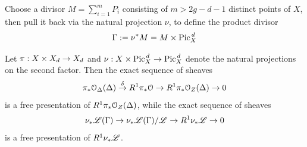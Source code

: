 		\begin{defi}\label{def:Gamma}
			Choose a divisor $M = \sum_{i=1}^m P_i$ consisting of $m > 2g-d-1$ distinct points of $X$, then pull it back via the natural projection $\nu$, to define the product divisor $$\Gamma := \nu^* M = M\times \operatorname{Pic}^{\,d}_X$$
		\end{defi}	


		\begin{prop}\label{prop:free_pres}
			Let $\pi : X\times X_d \to X_d$ and $\nu : X\times \operatorname{Pic}^{\,d}_X \to \operatorname{Pic}^{\,d}_X$ denote the natural projections on the second factor. Then the exact sequence of sheaves
			\begin{equation}\label{eq:univ_div_seq}
				\pi_* \mathcal{O}_{\Delta}(\Delta)\overset{\delta}\to R^1 \pi_* \mathcal{O} \to R^1 \pi_* \mathcal{O}_Z(\Delta) \to 0
			\end{equation}
			is a free presentation of $R^1 \pi_* \mathcal{O}_Z(\Delta)$, while the exact sequence of sheaves
			\begin{equation}\label{eq:univ_lb_seq}
				\nu_{*} \mathscr{L}(\Gamma)\to \nu_{*} \mathscr{L}(\Gamma) / \mathscr{L} \to R^1 \nu_{*} \mathscr{L} \to 0
			\end{equation}		
			is a free presentation of $R^1 \nu_{*} \mathscr{L}$.
		\end{prop}
